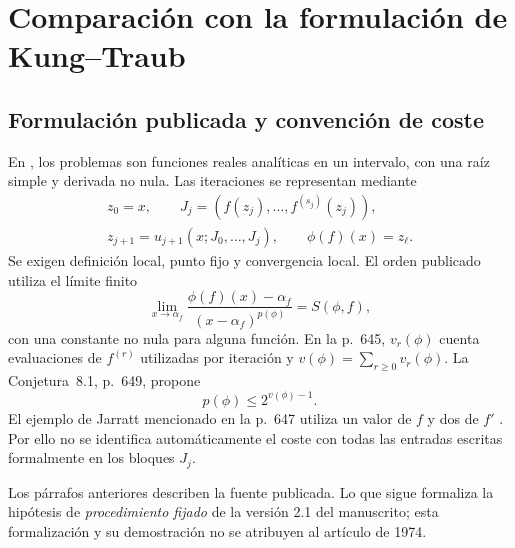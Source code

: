 \documentclass[11pt,a4paper]{article}
\numberwithin{equation}{section}
\theoremstyle{definition}
\theoremstyle{remark}
\begin{document}
\clearpage
\section{Comparación con la formulación de Kung--Traub}\label{sec:KT}

\subsection{Formulación publicada y convención de coste}
En \cite[Sec.~2, p.~644]{KT}, los problemas son funciones reales analíticas en un intervalo, con una raíz simple y derivada no nula. Las iteraciones se representan mediante
\begin{equation}\label{eq:KTscheme}
\begin{gathered}
z_0=x,\qquad
J_j=(f(z_j),\ldots,f^{(s_j)}(z_j)),\\
z_{j+1}=u_{j+1}(x;J_0,\ldots,J_j),\qquad
\phi(f)(x)=z_\ell.
\end{gathered}
\end{equation}
Se exigen definición local, punto fijo y convergencia local. El orden publicado utiliza el límite finito
\begin{equation}\label{eq:KTorder}
\lim_{x\to\alpha_f}
\frac{\phi(f)(x)-\alpha_f}{(x-\alpha_f)^{p(\phi)}}
=S(\phi,f),
\end{equation}
con una constante no nula para alguna función. En la p.~645, $v_r(\phi)$ cuenta evaluaciones de $f^{(r)}$ utilizadas por iteración y $v(\phi)=\sum_{r\ge0}v_r(\phi)$. La Conjetura~8.1, p.~649, propone
\begin{equation}\label{eq:KTconj}
p(\phi)\le2^{v(\phi)-1}.
\end{equation}
El ejemplo de Jarratt mencionado en la p.~647 utiliza un valor de $f$ y dos de $f'$ \cite{KT}. Por ello no se identifica automáticamente el coste con todas las entradas escritas formalmente en los bloques $J_j$.

Los párrafos anteriores describen la fuente publicada. Lo que sigue formaliza la hipótesis de \emph{procedimiento fijado} de la versión 2.1 del manuscrito; esta formalización y su demostración no se atribuyen al artículo de 1974.
\end{document}
